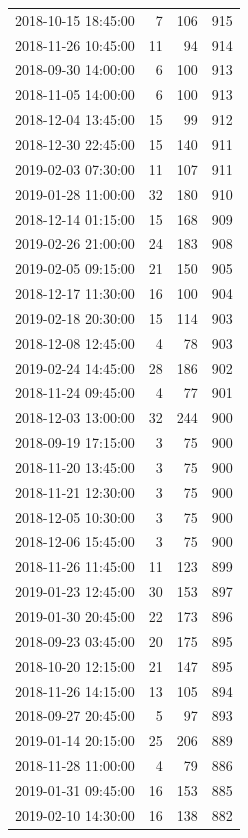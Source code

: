 \begin{tabular}{lrrr}
2018-10-15 18:45:00 & 7 & 106 & 915 \\
2018-11-26 10:45:00 & 11 & 94 & 914 \\
2018-09-30 14:00:00 & 6 & 100 & 913 \\
2018-11-05 14:00:00 & 6 & 100 & 913 \\
2018-12-04 13:45:00 & 15 & 99 & 912 \\
2018-12-30 22:45:00 & 15 & 140 & 911 \\
2019-02-03 07:30:00 & 11 & 107 & 911 \\
2019-01-28 11:00:00 & 32 & 180 & 910 \\
2018-12-14 01:15:00 & 15 & 168 & 909 \\
2019-02-26 21:00:00 & 24 & 183 & 908 \\
2019-02-05 09:15:00 & 21 & 150 & 905 \\
2018-12-17 11:30:00 & 16 & 100 & 904 \\
2019-02-18 20:30:00 & 15 & 114 & 903 \\
2018-12-08 12:45:00 & 4 & 78 & 903 \\
2019-02-24 14:45:00 & 28 & 186 & 902 \\
2018-11-24 09:45:00 & 4 & 77 & 901 \\
2018-12-03 13:00:00 & 32 & 244 & 900 \\
2018-09-19 17:15:00 & 3 & 75 & 900 \\
2018-11-20 13:45:00 & 3 & 75 & 900 \\
2018-11-21 12:30:00 & 3 & 75 & 900 \\
2018-12-05 10:30:00 & 3 & 75 & 900 \\
2018-12-06 15:45:00 & 3 & 75 & 900 \\
2018-11-26 11:45:00 & 11 & 123 & 899 \\
2019-01-23 12:45:00 & 30 & 153 & 897 \\
2019-01-30 20:45:00 & 22 & 173 & 896 \\
2018-09-23 03:45:00 & 20 & 175 & 895 \\
2018-10-20 12:15:00 & 21 & 147 & 895 \\
2018-11-26 14:15:00 & 13 & 105 & 894 \\
2018-09-27 20:45:00 & 5 & 97 & 893 \\
2019-01-14 20:15:00 & 25 & 206 & 889 \\
2018-11-28 11:00:00 & 4 & 79 & 886 \\
2019-01-31 09:45:00 & 16 & 153 & 885 \\
2019-02-10 14:30:00 & 16 & 138 & 882 \\

\end{tabular}
